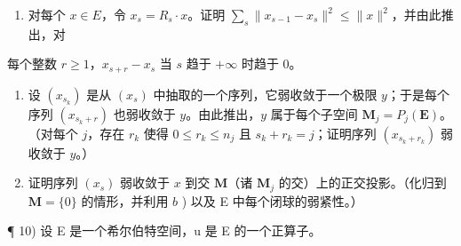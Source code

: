 \begin{enumerate}
\def\labelenumi{\alph{enumi})}
\tightlist
\item
  对每个 \(x\in E\)，令 \(x_{s}=R_{s}\cdot x\)。证明 \(\sum_{s}\|x_{s-1}-x_{s}\|^{2}\leqslant\|x\|^{2}\)，并由此推出，对
\end{enumerate}

每个整数 \(r \geqslant 1\)，\(x_{s + r} - x_s\) 当 \(s\) 趋于 \(+\infty\) 时趋于 0。

\begin{enumerate}
\def\labelenumi{\alph{enumi})}
\setcounter{enumi}{1}
\item
  设 \((x_{s_k})\) 是从 \((x_s)\) 中抽取的一个序列，它弱收敛于一个极限 \(y\)；于是每个序列 \((x_{s_k + r})\) 也弱收敛于 \(y\)。由此推出，\(y\) 属于每个子空间 \(\mathbf{M}_j = P_j(\mathbf{E})\)。（对每个 \(j\)，存在 \(r_k\) 使得 \(0 \leqslant r_k \leqslant n_j\) 且 \(s_k + r_k = j\)；证明序列 \((x_{s_k + r_k})\) 弱收敛于 \(y\)。）
\item
  证明序列 \((x_{s})\) 弱收敛于 \(x\) 到交 \(\mathbf{M}\)（诸 \(\mathbf{M}_{j}\) 的交）上的正交投影。（化归到 \(\mathbf{M} = \{0\}\) 的情形，并利用 \(b\) ) 以及 E 中每个闭球的弱紧性。）
\end{enumerate}

¶ 10) 设 E 是一个希尔伯特空间，u 是 E 的一个正算子。

